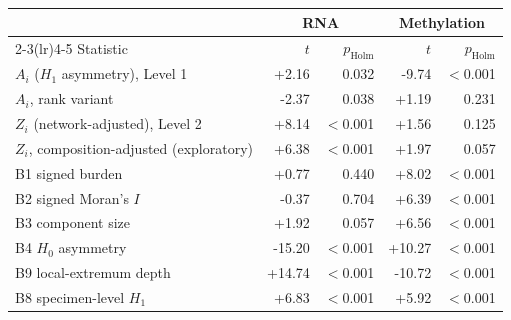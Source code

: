 \begin{tabular}{lrrrr}
\toprule
 & \multicolumn{2}{c}{RNA} & \multicolumn{2}{c}{Methylation} \\
\cmidrule(lr){2-3}\cmidrule(lr){4-5}
Statistic & $t$ & $p_{\mathrm{Holm}}$ & $t$ & $p_{\mathrm{Holm}}$ \\
\midrule
$A_i$ ($H_1$ asymmetry), Level 1 & +2.16 & 0.032 & -9.74 & $<$0.001 \\
$A_i$, rank variant & -2.37 & 0.038 & +1.19 & 0.231 \\
$Z_i$ (network-adjusted), Level 2 & +8.14 & $<$0.001 & +1.56 & 0.125 \\
$Z_i$, composition-adjusted (exploratory) & +6.38 & $<$0.001 & +1.97 & 0.057 \\
\midrule
B1 signed burden & +0.77 & 0.440 & +8.02 & $<$0.001 \\
B2 signed Moran's $I$ & -0.37 & 0.704 & +6.39 & $<$0.001 \\
B3 component size & +1.92 & 0.057 & +6.56 & $<$0.001 \\
B4 $H_0$ asymmetry & -15.20 & $<$0.001 & +10.27 & $<$0.001 \\
B9 local-extremum depth & +14.74 & $<$0.001 & -10.72 & $<$0.001 \\
B8 specimen-level $H_1$ & +6.83 & $<$0.001 & +5.92 & $<$0.001 \\
\bottomrule
\end{tabular}
